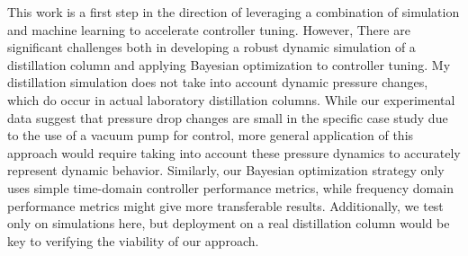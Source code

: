 This work is a first step in the direction of leveraging a combination of simulation and machine learning to accelerate controller tuning. However, There are significant challenges both in developing a robust dynamic simulation of a distillation column and applying Bayesian optimization to controller tuning. My distillation simulation does not take into account dynamic pressure changes, which do occur in actual laboratory distillation columns. While our experimental data suggest that pressure drop changes are small in the specific case study due to the use of a vacuum pump for control, more general application of this approach would require taking into account these pressure dynamics to accurately represent dynamic behavior. Similarly, our Bayesian optimization strategy only uses simple time-domain controller performance metrics, while frequency domain performance metrics might give more transferable results. Additionally, we test only on simulations here, but deployment on a real distillation column would be key to verifying the viability of our approach.

